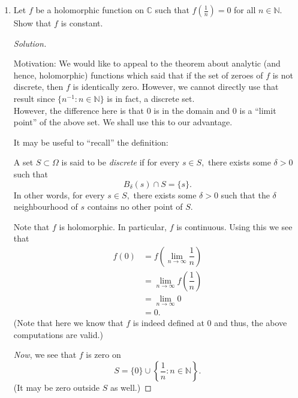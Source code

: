 \documentclass[12pt]{article}
\theoremstyle{definition}
\newenvironment{blockquote}
{\begin{mdframed}[skipabove=0pt, skipbelow=0pt, innertopmargin=4pt, innerbottommargin=4pt, bottomline=false,topline=false,rightline=false, linewidth=2pt]}
{\end{mdframed}}
\newenvironment{soln}{\begin{proof}[Solution]}{\end{proof}}
\begin{document}
\begin{enumerate}[leftmargin=*]
\begin{soln}
\begin{equation*}
			f(2) = \sin\left(\dfrac{\pi}{2}\right) = 1 \neq 0. \qedhere
		\end{equation*}
	\end{soln}
	\item Let $f$ be a holomorphic function on $\mathbb{C}$ such that $f\left(\frac{1}{n}\right) = 0$ for all $n \in \mathbb{N}.$ Show that $f$ is constant.
	\begin{soln}\phantom{hi}\\
		\begin{blockquote}
		Motivation: We would like to appeal to the theorem about analytic (and hence, holomorphic) functions which said that if the set of zeroes of $f$ is not discrete, then $f$ is identically zero. However, we cannot directly use that result since $\{n^{-1} : n \in \mathbb{N}\}$ is in fact, a discrete set.\\
		However, the difference here is that $0$ is in the domain and $0$ is a ``limit point'' of the above set. We shall use this to our advantage.

		It may be useful to ``recall'' the definition:

		\begin{defn}
			A set $S \subset \Omega$ is said to be \emph{discrete} if for every $s \in S,$ there exists some $\delta > 0$ such that
			\begin{equation*} 
				B_\delta(s) \cap S = \{s\}.
			\end{equation*}
			In other words, for every $s \in S,$ there exists some $\delta > 0$ such that the $\delta$ neighbourhood of $s$ contains no other point of $S.$
		\end{defn}
		\end{blockquote}

		Note that $f$ is holomorphic. In particular, $f$ is continuous. Using this we see that
		\begin{align*} 
			f(0) &= f\left(\lim_{n\to \infty}\dfrac{1}{n}\right)\\
			&=\lim_{n\to \infty}f\left(\dfrac{1}{n}\right)\\
			&= \lim_{n\to \infty}0\\
			&= 0.
		\end{align*}
		(Note that here we know that $f$ is indeed defined at $0$ and thus, the above computations are valid.)

		\emph{Now}, we see that $f$ is zero on
		\begin{equation*} 
			S = \{0\}\cup\left\{\dfrac{1}{n} : n \in \mathbb{N}\right\}.
		\end{equation*}
		(It may be zero outside $S$ as well.)


\end{soln}
\end{enumerate}
\end{document}
